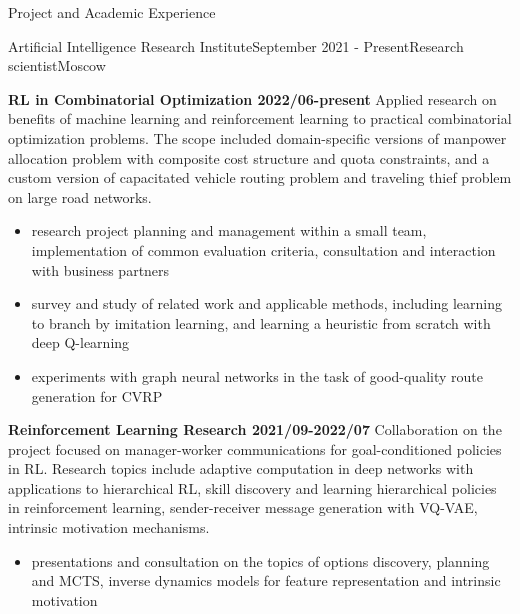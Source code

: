\documentclass{resume} %
\begin{document}
\begin{rSection}{Project and Academic Experience}

\begin{rSubsection}{Artificial Intelligence Research Institute}{September 2021 - Present}{Research scientist}{Moscow}
    \bigskip

    \item \textbf{RL in Combinatorial Optimization 2022/06-present}
    Applied research on benefits of machine learning and reinforcement learning to practical
    combinatorial optimization problems. The scope included domain-specific versions of manpower
    allocation problem with composite cost structure and quota constraints, and a custom version
    of capacitated vehicle routing problem and traveling thief problem on large road networks.
    \begin{itemize}
        \item research project planning and management within a small team, implementation
        of common evaluation criteria, consultation and interaction with business partners

        \item survey and study of related work and applicable methods, including learning to
        branch by imitation learning, and learning a heuristic from scratch with deep Q-learning

        \item experiments with graph neural networks in the task of good-quality route
        generation for CVRP
    \end{itemize}

    \medskip
    \item \textbf{Reinforcement Learning Research 2021/09-2022/07}
    Collaboration on the project focused on manager-worker communications for goal-conditioned
    policies in RL.
    Research topics include adaptive computation in deep networks with applications to
    hierarchical RL, skill discovery and learning hierarchical policies in reinforcement
    learning, sender-receiver message generation with VQ-VAE, intrinsic motivation mechanisms.
    \begin{itemize}
        \item presentations and consultation on the topics of options discovery, planning and
        MCTS, inverse dynamics models for feature representation and intrinsic motivation
        

\end{itemize}
\end{rSubsection}
\end{rSection}
\end{document}
